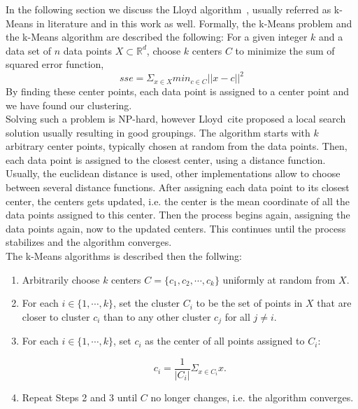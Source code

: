 In the following section we discuss the Lloyd algorithm~\parencite{Lloyd82}, usually referred as k-Means in literature and in this work as well. Formally, the k-Means problem and the k-Means algorithm are described the following: For a given integer $k$ and a data set of $n$ data points $X \subset  \mathbb{R}^d$, choose $k$ centers $C$ to minimize the sum of squared error function,
\begin{equation*}
sse = \Sigma_{x \in X} min_{c \in C} ||x - c||^2
\end{equation*}
By finding these center points, each data point is assigned to a center point and we have found our clustering.
\\ 
Solving such a problem is NP-hard, however Lloyd~cite proposed a local search solution usually resulting in good groupings. The algorithm starts with $k$ arbitrary center points, typically chosen at random from the data points. Then, each data point is assigned to the closest center, using a distance function. Usually, the euclidean distance is used, other implementations allow to choose between several distance functions. After assigning each data point to its closest center, the centers gets updated, i.e. the center is the mean coordinate of all the data points assigned to this center. Then the process begins again, assigning the data points again, now to the updated centers. This continues until the process stabilizes and the algorithm converges.
\\
The k-Means algorithms is described then the follwing:

\begin{enumerate} 
\item Arbitrarily choose $k$ centers $C = \{c_1, c_2, \cdots, c_k\}$ uniformly at random from $X$.
\item For each $i \in \{1, \cdots, k\}$, set the cluster $C_i$ to be the set of points in $X$ that are closer to cluster $c_i$ than to any other cluster $c_j$ for all $j \neq i$.
\item For each $i \in \{1, \cdots, k\}$, set $c_i$ as the center of all points assigned to $C_i$: 

\begin{equation*}
c_i = \frac{1}{|C_i|} \Sigma_{x \in C_i} x.
\end{equation*}

\item Repeat Steps 2 and 3 until $C$ no longer changes, i.e. the algorithm converges.
\end{enumerate}

